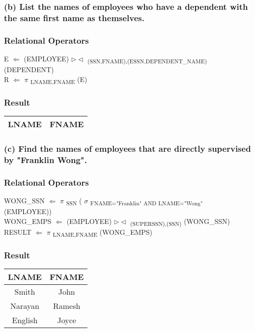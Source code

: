 \documentclass[11pt, oneside]{article}   	%
\begin{document}
\subsubsection*{(b) List the names of employees who have a dependent with the same first name as themselves.}
\subsubsection*{Relational Operators}
E $\Leftarrow$ (EMPLOYEE) $\rhd\lhd$ \textsubscript{(SSN,FNAME),(ESSN,DEPENDENT\_NAME)} (DEPENDENT)\\
R $\Leftarrow$ $\pi$ \textsubscript{LNAME,FNAME} (E)

\subsubsection*{Result}
\begin{center}
\begin{tabular}{ c | c }
  LNAME & FNAME \\ \hline
\end{tabular}
\end{center}

\subsubsection*{(c) Find the names of employees that are directly supervised by "Franklin Wong".}
\subsubsection*{Relational Operators}
WONG\_SSN $\Leftarrow$ $\pi$ \textsubscript{SSN} ( $\sigma$ \textsubscript{FNAME="Franklin" AND LNAME="Wong"} (EMPLOYEE))\\
WONG\_EMPS $\Leftarrow$ (EMPLOYEE) $\rhd\lhd$ \textsubscript{(SUPERSSN),(SSN)} (WONG\_SSN)\\
RESULT $\Leftarrow$ $\pi$ \textsubscript{LNAME,FNAME} (WONG\_EMPS)

\subsubsection*{Result}
\begin{center}
\begin{tabular}{ c | c }
  LNAME & FNAME \\ \hline
  Smith & John \\
  Narayan & Ramesh \\
  English & Joyce \\
\end{tabular}
\end{center}
\end{document}
